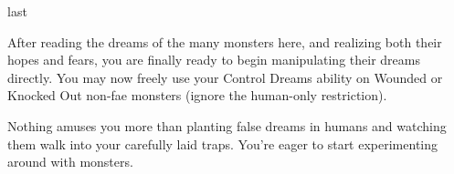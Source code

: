 \documentclass[notebook]{guildcamp2} %
\begin{document}
\begin{page}{last}

After reading the dreams of the many monsters here, and realizing both their hopes and fears, you are finally ready to begin manipulating their dreams directly. You may now freely use your Control Dreams ability on Wounded or Knocked Out non-fae monsters (ignore the human-only restriction).

Nothing amuses you more than planting false dreams in humans and watching them walk into your carefully laid traps. You're eager to start experimenting around with monsters.

\end{page}

\endnotebook
\end{document}
